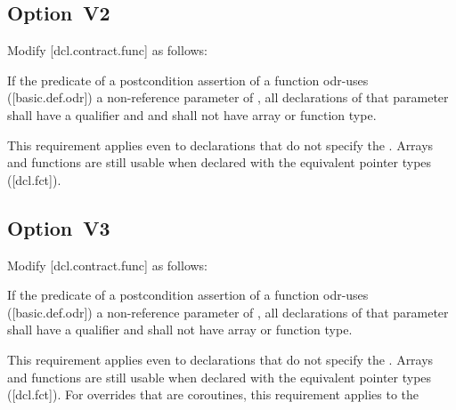 \subsection*{Option~V2}

Modify [dcl.contract.func] as follows:

\begin{adjustwidth}{0.5cm}{0.5cm}
If the predicate of a postcondition assertion of a function odr-uses ([basic.def.odr]) a
non-reference parameter of , all declarations of that parameter shall have a  qualifier and and shall not have array or function type.
\begin{note}
This requirement applies even to declarations
that do not specify the . Arrays and functions are still usable when declared with the equivalent pointer types ([dcl.fct]).
\end{note}
\begin{example}
\tcode{[...]}
\end{example}
\end{adjustwidth}

\subsection*{Option~V3}

Modify [dcl.contract.func] as follows:

\begin{adjustwidth}{0.5cm}{0.5cm}
If the predicate of a postcondition assertion of a function odr-uses ([basic.def.odr]) a
non-reference parameter of , all declarations of
that parameter shall have a  qualifier and shall not have array or function type.
\begin{note}
This requirement applies even to declarations
that do not specify the . Arrays and functions are still usable when declared with the equivalent pointer types ([dcl.fct]).  For overrides that are coroutines, this requirement applies to the 
\end{note}
\begin{example}
\tcode{[...]}
\end{example}
\end{adjustwidth}

